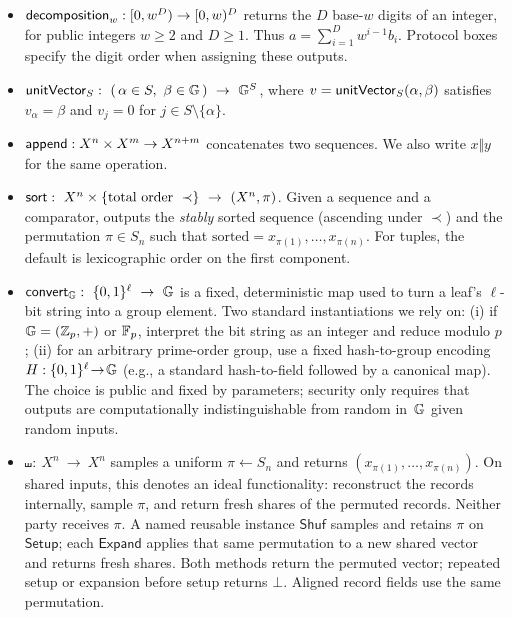 \begin{itemize}
  \item $\mathsf{decomposition}_w:[0,w^D)\to[0,w)^D$ returns the $D$ base-$w$ digits
  of an integer, for public integers $w\geq2$ and $D\geq1$.
  Thus $a=\sum_{i=1}^D w^{i-1}b_i$. Protocol boxes specify the digit order
  when assigning these outputs.

  \item $\unitVec_{S}:\ (\,\alpha\in S,\ \beta\in \GG\,)\ \rightarrow\ \GG^{S}$, where
  $v=\mathsf{unitVector}_{S}(\alpha,\beta)$ satisfies $v_\alpha=\beta$ and $v_j=0$ for $j\in S\setminus\{\alpha\}$.

  \item $\mathsf{append}:X^n\times X^m\to X^{n+m}$ concatenates two sequences.
  We also write $x\Vert y$ for the same operation.

  \item $\mathsf{sort}:\ X^{n}\times \{\text{total order }\prec\}\ \rightarrow\ (X^{n},\pi)$.
  Given a sequence and a comparator, outputs the \emph{stably} sorted sequence (ascending under $\prec$) and the permutation
  $\pi\in S_n$ such that $\text{sorted}=x_{\pi(1)},\ldots,x_{\pi(n)}$. For tuples, the default is lexicographic order on the first component.

  \item $\convert_\GG:\ \{0,1\}^{\ell}\ \rightarrow\ \GG$ is a fixed, deterministic map used to turn a leaf’s $\ell$-bit string into a group element.
  Two standard instantiations we rely on:
  (i) if $\mathbb{G}=(\mathbb{Z}_p,+)$ or $\mathbb{F}_p$, interpret the bit string as an integer and reduce modulo $p$;
  (ii) for an arbitrary prime-order group, use a fixed hash-to-group encoding $H:\{0,1\}^{\ell}\!\to\!\mathbb{G}$ (e.g., a standard hash-to-field followed by a canonical map).
  The choice is public and fixed by parameters; security only requires that outputs are computationally indistinguishable from random in~$\mathbb{G}$ given random inputs.

  \item $\shuffle:\ X^{n}\ \rightarrow\ X^{n}$ samples a uniform $\pi\gets S_n$ and returns
  $(x_{\pi(1)},\ldots,x_{\pi(n)})$.
  On shared inputs, this denotes an ideal functionality: reconstruct the
  records internally, sample $\pi$, and return fresh shares of the permuted
  records. Neither party receives $\pi$.
  A named reusable instance $\mathsf{Shuf}$ samples and retains $\pi$ on
  $\mathsf{Setup}$; each $\mathsf{Expand}$ applies that same permutation to a
  new shared vector and returns fresh shares. Both methods return the
  permuted vector; repeated setup or expansion before setup returns $\bot$.
  Aligned record fields use the same permutation.


\end{itemize}
